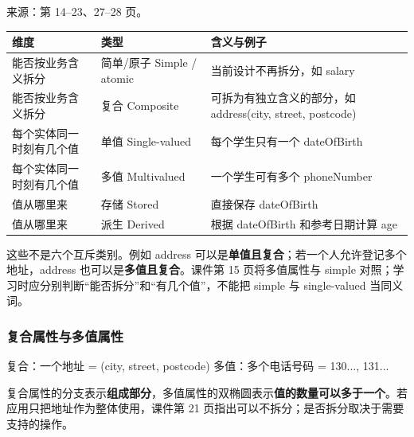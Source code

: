 来源：第 14--23、27--28 页。

\begin{longtable}[]{@{}
  >{\raggedright\arraybackslash}p{}
  >{\raggedright\arraybackslash}p{}
  >{\raggedright\arraybackslash}p{}@{}}
\toprule\noalign{}
\begin{minipage}[b]{\linewidth}\raggedright
维度
\end{minipage} & \begin{minipage}[b]{\linewidth}\raggedright
类型
\end{minipage} & \begin{minipage}[b]{\linewidth}\raggedright
含义与例子
\end{minipage} \\
\midrule\noalign{}
\endhead
\bottomrule\noalign{}
\endlastfoot
能否按业务含义拆分 & 简单/原子 Simple / atomic & 当前设计不再拆分，如 salary \\
能否按业务含义拆分 & 复合 Composite & 可拆为有独立含义的部分，如 address(city, street, postcode) \\
每个实体同一时刻有几个值 & 单值 Single-valued & 每个学生只有一个 dateOfBirth \\
每个实体同一时刻有几个值 & 多值 Multivalued & 一个学生可有多个 phoneNumber \\
值从哪里来 & 存储 Stored & 直接保存 dateOfBirth \\
值从哪里来 & 派生 Derived & 根据 dateOfBirth 和参考日期计算 age \\
\end{longtable}

这些不是六个互斥类别。例如 address 可以是\textbf{单值且复合}；若一个人允许登记多个地址，address 也可以是\textbf{多值且复合}。课件第 15 页将多值属性与 simple 对照；学习时应分别判断``能否拆分''和``有几个值''，不能把 simple 与 single-valued 当同义词。

\subsubsection{复合属性与多值属性}\label{02_er_modelling_zh-ux590dux5408ux5c5eux6027ux4e0eux591aux503cux5c5eux6027}

\begin{StudyCode}
复合：一个地址 = (city, street, postcode)
多值：多个电话号码 = {130..., 131...}
\end{StudyCode}

复合属性的分支表示\textbf{组成部分}，多值属性的双椭圆表示\textbf{值的数量可以多于一个}。若应用只把地址作为整体使用，课件第 21 页指出可以不拆分；是否拆分取决于需要支持的操作。

